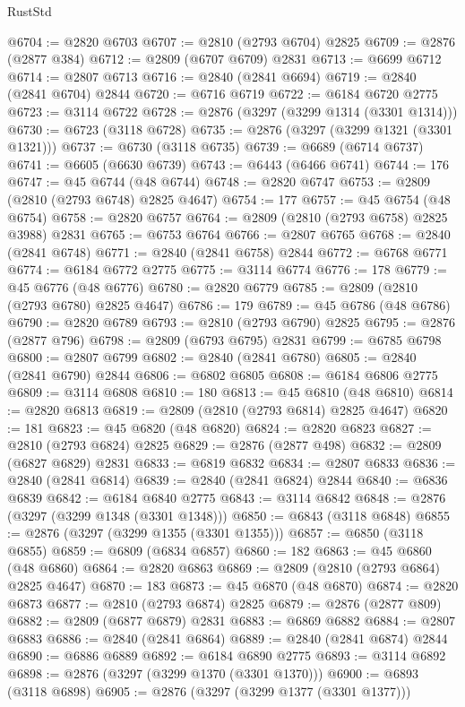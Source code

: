 \begin{lexlean}{RustStd}
\begin{coremodule}
{\begin{coremodule}
{{{{{{{{{{{{{{{{{{{{{{{{{{{{{{{{{@6704 := @2820 @6703
@6707 := @2810 (@2793 @6704) @2825
@6709 := @2876 (@2877 @384)
@6712 := @2809 (@6707 @6709) @2831
@6713 := @6699 @6712
@6714 := @2807 @6713
@6716 := @2840 (@2841 @6694)
@6719 := @2840 (@2841 @6704) @2844
@6720 := @6716 @6719
@6722 := @6184 @6720 @2775
@6723 := @3114 @6722
@6728 := @2876 (@3297 (@3299 @1314 (@3301 @1314)))
@6730 := @6723 (@3118 @6728)
@6735 := @2876 (@3297 (@3299 @1321 (@3301 @1321)))
@6737 := @6730 (@3118 @6735)
@6739 := @6689 (@6714 @6737)
@6741 := @6605 (@6630 @6739)
@6743 := @6443 (@6466 @6741)
@6744 := 176
@6747 := @45 @6744 (@48 @6744)
@6748 := @2820 @6747
@6753 := @2809 (@2810 (@2793 @6748) @2825 @4647)
@6754 := 177
@6757 := @45 @6754 (@48 @6754)
@6758 := @2820 @6757
@6764 := @2809 (@2810 (@2793 @6758) @2825 @3988) @2831
@6765 := @6753 @6764
@6766 := @2807 @6765
@6768 := @2840 (@2841 @6748)
@6771 := @2840 (@2841 @6758) @2844
@6772 := @6768 @6771
@6774 := @6184 @6772 @2775
@6775 := @3114 @6774
@6776 := 178
@6779 := @45 @6776 (@48 @6776)
@6780 := @2820 @6779
@6785 := @2809 (@2810 (@2793 @6780) @2825 @4647)
@6786 := 179
@6789 := @45 @6786 (@48 @6786)
@6790 := @2820 @6789
@6793 := @2810 (@2793 @6790) @2825
@6795 := @2876 (@2877 @796)
@6798 := @2809 (@6793 @6795) @2831
@6799 := @6785 @6798
@6800 := @2807 @6799
@6802 := @2840 (@2841 @6780)
@6805 := @2840 (@2841 @6790) @2844
@6806 := @6802 @6805
@6808 := @6184 @6806 @2775
@6809 := @3114 @6808
@6810 := 180
@6813 := @45 @6810 (@48 @6810)
@6814 := @2820 @6813
@6819 := @2809 (@2810 (@2793 @6814) @2825 @4647)
@6820 := 181
@6823 := @45 @6820 (@48 @6820)
@6824 := @2820 @6823
@6827 := @2810 (@2793 @6824) @2825
@6829 := @2876 (@2877 @498)
@6832 := @2809 (@6827 @6829) @2831
@6833 := @6819 @6832
@6834 := @2807 @6833
@6836 := @2840 (@2841 @6814)
@6839 := @2840 (@2841 @6824) @2844
@6840 := @6836 @6839
@6842 := @6184 @6840 @2775
@6843 := @3114 @6842
@6848 := @2876 (@3297 (@3299 @1348 (@3301 @1348)))
@6850 := @6843 (@3118 @6848)
@6855 := @2876 (@3297 (@3299 @1355 (@3301 @1355)))
@6857 := @6850 (@3118 @6855)
@6859 := @6809 (@6834 @6857)
@6860 := 182
@6863 := @45 @6860 (@48 @6860)
@6864 := @2820 @6863
@6869 := @2809 (@2810 (@2793 @6864) @2825 @4647)
@6870 := 183
@6873 := @45 @6870 (@48 @6870)
@6874 := @2820 @6873
@6877 := @2810 (@2793 @6874) @2825
@6879 := @2876 (@2877 @809)
@6882 := @2809 (@6877 @6879) @2831
@6883 := @6869 @6882
@6884 := @2807 @6883
@6886 := @2840 (@2841 @6864)
@6889 := @2840 (@2841 @6874) @2844
@6890 := @6886 @6889
@6892 := @6184 @6890 @2775
@6893 := @3114 @6892
@6898 := @2876 (@3297 (@3299 @1370 (@3301 @1370)))
@6900 := @6893 (@3118 @6898)
@6905 := @2876 (@3297 (@3299 @1377 (@3301 @1377)))
}}}}}}}}}}}}}}}}}}}}}}}}}}}}}}}}}
\end{coremodule}}
\end{coremodule}
\end{lexlean}
